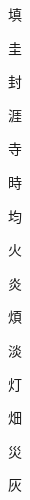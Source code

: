 \begin{spacing}{2.5}
{\Huge \begin{CJK}{UTF8}{min} 填\end{CJK}}\hspace{0.1cm}
{\Huge \begin{CJK}{UTF8}{min} 圭\end{CJK}}\hspace{0.1cm}
{\Huge \begin{CJK}{UTF8}{min} 封\end{CJK}}\hspace{0.1cm}
{\Huge \begin{CJK}{UTF8}{min} 涯\end{CJK}}\hspace{0.1cm}
{\Huge \begin{CJK}{UTF8}{min} 寺\end{CJK}}\hspace{0.1cm}
{\Huge \begin{CJK}{UTF8}{min} 時\end{CJK}}\hspace{0.1cm}
{\Huge \begin{CJK}{UTF8}{min} 均\end{CJK}}\hspace{0.1cm}
{\Huge \begin{CJK}{UTF8}{min} 火\end{CJK}}\hspace{0.1cm}
{\Huge \begin{CJK}{UTF8}{min} 炎\end{CJK}}\hspace{0.1cm}
{\Huge \begin{CJK}{UTF8}{min} 煩\end{CJK}}\hspace{0.1cm}
{\Huge \begin{CJK}{UTF8}{min} 淡\end{CJK}}\hspace{0.1cm}
{\Huge \begin{CJK}{UTF8}{min} 灯\end{CJK}}\hspace{0.1cm}
{\Huge \begin{CJK}{UTF8}{min} 畑\end{CJK}}\hspace{0.1cm}
{\Huge \begin{CJK}{UTF8}{min} 災\end{CJK}}\hspace{0.1cm}
{\Huge \begin{CJK}{UTF8}{min} 灰\end{CJK}}\hspace{0.1cm}

\end{spacing}
